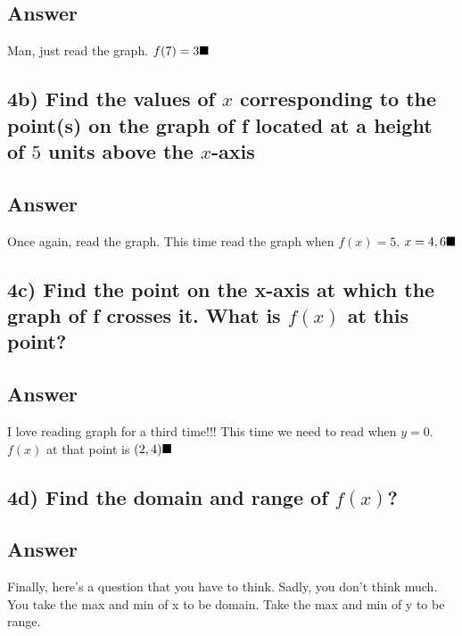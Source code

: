 \documentclass[17 pt]{extarticle}
\begin{document}
\subsection*{Answer}

Man, just read the graph. $f(7)=3 \\ \blacksquare$
\vspace{10mm}
\subsection*{4b) Find the values of $x$ corresponding to the point(s) on the
graph of f located at a height of $5$ units above the $x$-axis}
\vspace{5mm}
\subsection*{Answer}

Once again, read the graph. This time read the graph when $f(x)=5$. $x = 4,6 \\ \blacksquare$
\vspace{5mm}

\subsection*{4c) Find the point on the x-axis at which the graph of f crosses it. What is $f(x)$ at this point?}
\vspace{5mm}
\subsection*{Answer}

I love reading graph for a third time!!! This time we need to read when $y=0$. $f(x)$ at that point is $(2,4) \\ \blacksquare$

\vspace{10mm}

\subsection*{4d) Find the domain and range of $f(x)$?}
\vspace{5mm}
\subsection*{Answer}

Finally, here's a question that you have to think. Sadly, you don't think much. You take the max and min of x to be domain. Take the max and min
of y to be range. 
\end{document}
